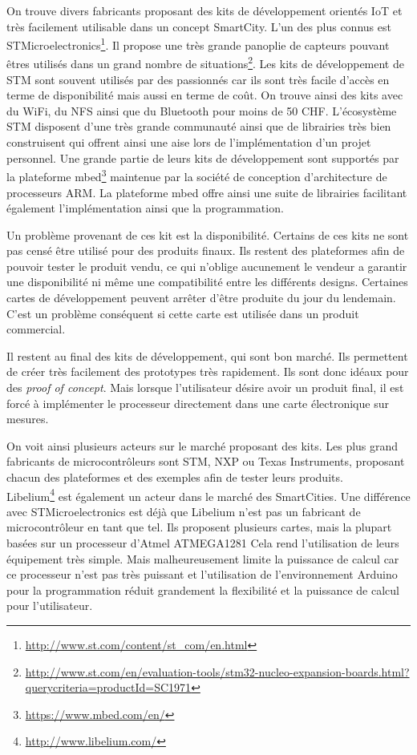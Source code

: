 On trouve divers fabricants proposant des kits de développement orientés IoT et très facilement utilisable dans un concept SmartCity. L'un des plus connus est STMicroelectronics\footnote{\url{http://www.st.com/content/st_com/en.html}}. Il propose une très grande panoplie de capteurs pouvant êtres utilisés dans un grand nombre de situations\footnote{\url{http://www.st.com/en/evaluation-tools/stm32-nucleo-expansion-boards.html?querycriteria=productId=SC1971}}. Les kits de développement de STM sont souvent utilisés par des passionnés car ils sont très facile d'accès en terme de disponibilité mais aussi en terme de coût. On trouve ainsi des kits avec du WiFi, du NFS ainsi que du Bluetooth pour moins de 50 CHF. L'écosystème STM disposent d'une très grande communauté ainsi que de librairies très bien construisent qui offrent ainsi une aise lors de l'implémentation d'un projet personnel. Une grande partie de leurs kits de développement sont supportés par la plateforme mbed\footnote{\url{https://www.mbed.com/en/}} maintenue par la société de conception d'architecture de processeurs ARM. La plateforme mbed offre ainsi une suite de librairies facilitant également l'implémentation ainsi que la programmation. 

Un problème provenant de ces kit est la disponibilité. Certains de ces kits ne sont pas censé être utilisé pour des produits finaux. Ils restent des plateformes afin de pouvoir tester le produit vendu, ce qui n'oblige aucunement le vendeur a garantir une disponibilité ni même une compatibilité entre les différents designs. Certaines cartes de développement peuvent arrêter d'être produite du jour du lendemain. C'est un problème conséquent si cette carte est utilisée dans un produit commercial. 

Il restent au final des kits de développement, qui sont bon marché. Ils permettent de créer très facilement des prototypes très rapidement. Ils sont donc idéaux pour des \textit{proof of concept}. Mais lorsque l'utilisateur désire avoir un produit final, il est forcé à implémenter le processeur directement dans une carte électronique sur mesures.

On voit ainsi plusieurs acteurs sur le marché proposant des kits. Les plus grand fabricants de microcontrôleurs sont STM, NXP ou Texas Instruments, proposant chacun des plateformes et des exemples afin de tester leurs produits. \\


Libelium\footnote{\url{http://www.libelium.com/}} est également un acteur dans le marché des SmartCities. Une différence avec STMicroelectronics est déjà que Libelium n'est pas un fabricant de microcontrôleur en tant que tel. Ils proposent plusieurs cartes, mais la plupart basées sur un processeur d'Atmel ATMEGA1281 
Cela rend l'utilisation de leurs équipement très simple. Mais malheureusement limite la puissance de calcul car ce processeur n'est pas très puissant et l'utilisation de l'environnement Arduino pour la programmation réduit grandement la flexibilité et la puissance de calcul pour l'utilisateur.




